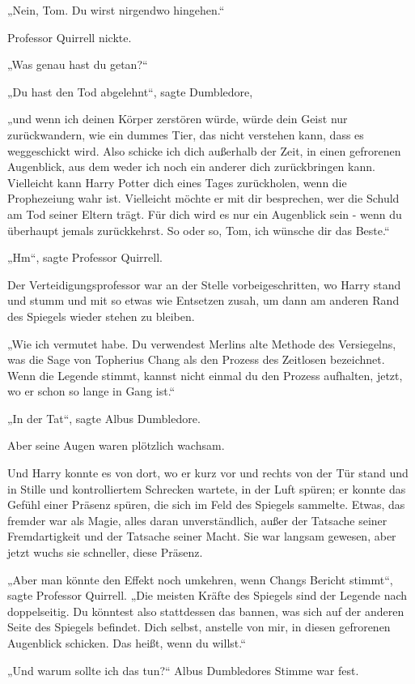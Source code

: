 {„Nein, Tom. Du wirst nirgendwo hingehen.“

Professor Quirrell nickte.

„Was genau hast du getan?“

„Du hast den Tod abgelehnt“, sagte Dumbledore,

„und wenn ich deinen Körper zerstören würde, würde dein Geist nur zurückwandern, wie ein dummes Tier, das nicht verstehen kann, dass es weggeschickt wird. Also schicke ich dich außerhalb der Zeit, in einen gefrorenen Augenblick, aus dem weder ich noch ein anderer dich zurückbringen kann. Vielleicht kann Harry Potter dich eines Tages zurückholen, wenn die Prophezeiung wahr ist. Vielleicht möchte er mit dir besprechen, wer die Schuld am Tod seiner Eltern trägt. Für dich wird es nur ein Augenblick sein - wenn du überhaupt jemals zurückkehrst. So oder so, Tom, ich wünsche dir das Beste.“

„Hm“, sagte Professor Quirrell.

Der Verteidigungsprofessor war an der Stelle vorbeigeschritten, wo Harry stand und stumm und mit so etwas wie Entsetzen zusah, um dann am anderen Rand des Spiegels wieder stehen zu bleiben.

„Wie ich vermutet habe. Du verwendest Merlins alte Methode des Versiegelns, was die Sage von Topherius Chang als den Prozess des Zeitlosen bezeichnet. Wenn die Legende stimmt, kannst nicht einmal du den Prozess aufhalten, jetzt, wo er schon so lange in Gang ist.“

„In der Tat“, sagte Albus Dumbledore.

Aber seine Augen waren plötzlich wachsam.

Und Harry konnte es von dort, wo er kurz vor und rechts von der Tür stand und in Stille und kontrolliertem Schrecken wartete, in der Luft spüren; er konnte das Gefühl einer Präsenz spüren, die sich im Feld des Spiegels sammelte. Etwas, das fremder war als Magie, alles daran unverständlich, außer der Tatsache seiner Fremdartigkeit und der Tatsache seiner Macht. Sie war langsam gewesen, aber jetzt wuchs sie schneller, diese Präsenz.

„Aber man könnte den Effekt noch umkehren, wenn Changs Bericht stimmt“, sagte Professor Quirrell. „Die meisten Kräfte des Spiegels sind der Legende nach doppelseitig. Du könntest also stattdessen das bannen, was sich auf der anderen Seite des Spiegels befindet. Dich selbst, anstelle von mir, in diesen gefrorenen Augenblick schicken. Das heißt, wenn du willst.“

„Und warum sollte ich das tun?“ Albus Dumbledores Stimme war fest.

}
